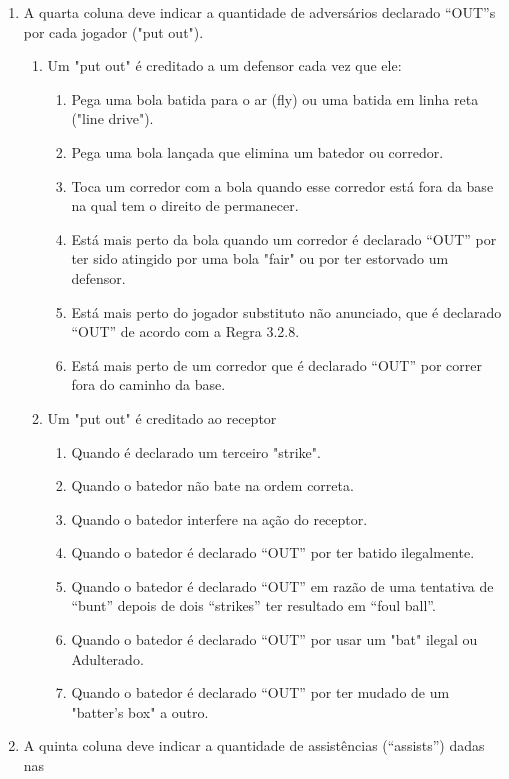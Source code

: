 \begin{multicols}{2}
\begin{enumerate}[label= \arabic*)]
		\item A quarta coluna deve indicar a quantidade de adversários declarado “OUT”s por 
		cada jogador ("put out"). 
		\begin{enumerate}[label= (\alph*)]
			\item Um "put out" é creditado a um defensor cada vez que ele: 
			\begin{enumerate}[label= (\arabic*)]
				\item Pega uma bola batida para o ar (\gls{fly}) ou uma batida em linha reta ("line drive"). 
				\item Pega uma bola lançada que elimina um batedor ou corredor. 
				\item Toca um corredor com a bola quando esse corredor está fora da base na qual tem o direito de permanecer. 
				\item Está mais perto da bola quando um corredor é declarado “OUT” por ter sido 
				atingido por uma bola "fair" ou por ter estorvado um defensor. 
				\item Está mais perto do jogador substituto não anunciado, que é declarado “OUT” de 
				acordo com a Regra 3.2.8. 
				\item Está mais perto de um corredor que é declarado “OUT” por correr fora do caminho da base. 
			\end{enumerate}		
			\item Um "put out" é creditado ao receptor 
			\begin{enumerate}[label= (\arabic*)]
				\item Quando é declarado um terceiro "strike". 
				\item Quando o batedor não bate na ordem correta. 
				\item Quando o batedor interfere na ação do receptor. 
				\item Quando o batedor é declarado “OUT” por ter batido ilegalmente. 
				\item  Quando o batedor é declarado “OUT” em razão de uma tentativa de “bunt” depois de dois “strikes” ter resultado em “foul ball”. 
				\item Quando o batedor é declarado “OUT” por usar um "bat" ilegal ou Adulterado. 
				\item Quando o batedor é declarado “OUT” por ter mudado de um "batter's box" a outro. 
			\end{enumerate}	
		\end{enumerate}
		\item A quinta coluna deve indicar a quantidade de assistências (“assists”) dadas nas 

\end{enumerate}
\end{multicols}
